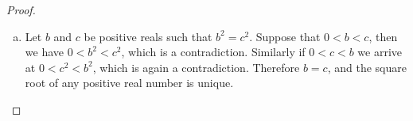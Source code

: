 \documentclass[11pt,a4paper,twoside]{article}
\theoremstyle{definition}
\begin{document}
\begin{proof}
\begin{enumerate}[(a)]
  \item Let $b$ and $c$ be positive reals such that $b^2 = c^2$. Suppose that $0 < b < c$, then we have $0 < b^2 < c^2$, which is a contradiction.
    Similarly if $0 < c < b$ we arrive at $0 < c^2 < b^2$, which is again a contradiction. Therefore $b = c$, and the square root of any positive real number is unique.

  \end{enumerate}

\end{proof}
\end{document}
